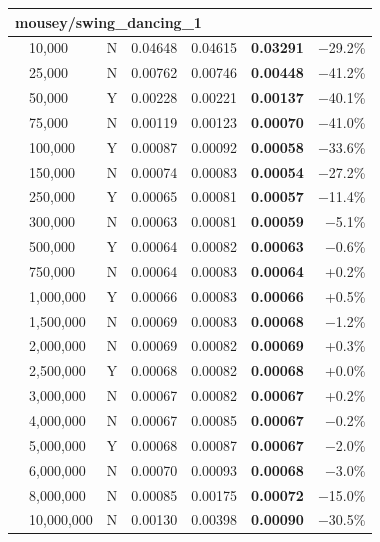 \documentclass[9pt]{article}
\begin{document}
\begin{longtable}{llr|rrr|r}
\midrule
\multicolumn{7}{l}{\textbf{mousey/swing\_dancing\_1}} \\
\midrule
 & 10,000 & N & 0.04648 & 0.04615 & \textbf{0.03291} & $-$29.2\% \\
 & 25,000 & N & 0.00762 & 0.00746 & \textbf{0.00448} & $-$41.2\% \\
 & 50,000 & Y & 0.00228 & 0.00221 & \textbf{0.00137} & $-$40.1\% \\
 & 75,000 & N & 0.00119 & 0.00123 & \textbf{0.00070} & $-$41.0\% \\
 & 100,000 & Y & 0.00087 & 0.00092 & \textbf{0.00058} & $-$33.6\% \\
 & 150,000 & N & 0.00074 & 0.00083 & \textbf{0.00054} & $-$27.2\% \\
 & 250,000 & Y & 0.00065 & 0.00081 & \textbf{0.00057} & $-$11.4\% \\
 & 300,000 & N & 0.00063 & 0.00081 & \textbf{0.00059} & $-$5.1\% \\
 & 500,000 & Y & 0.00064 & 0.00082 & \textbf{0.00063} & $-$0.6\% \\
 & 750,000 & N & 0.00064 & 0.00083 & \textbf{0.00064} & +0.2\% \\
 & 1,000,000 & Y & 0.00066 & 0.00083 & \textbf{0.00066} & +0.5\% \\
 & 1,500,000 & N & 0.00069 & 0.00083 & \textbf{0.00068} & $-$1.2\% \\
 & 2,000,000 & N & 0.00069 & 0.00082 & \textbf{0.00069} & +0.3\% \\
 & 2,500,000 & Y & 0.00068 & 0.00082 & \textbf{0.00068} & +0.0\% \\
 & 3,000,000 & N & 0.00067 & 0.00082 & \textbf{0.00067} & +0.2\% \\
 & 4,000,000 & N & 0.00067 & 0.00085 & \textbf{0.00067} & $-$0.2\% \\
 & 5,000,000 & Y & 0.00068 & 0.00087 & \textbf{0.00067} & $-$2.0\% \\
 & 6,000,000 & N & 0.00070 & 0.00093 & \textbf{0.00068} & $-$3.0\% \\
 & 8,000,000 & N & 0.00085 & 0.00175 & \textbf{0.00072} & $-$15.0\% \\
 & 10,000,000 & N & 0.00130 & 0.00398 & \textbf{0.00090} & $-$30.5\% \\


\end{longtable}
\end{document}
